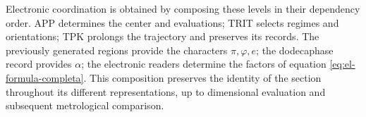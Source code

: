 Electronic coordination is obtained by composing these levels in their
dependency order. APP determines the center and evaluations;
TRIT selects regimes and orientations; TPK prolongs the trajectory
and preserves its records. The previously generated regions provide
the characters \(\pi,\varphi,e\); the dodecaphase record provides
\(\alpha\); the electronic readers determine the factors of
equation \eqref{eq:el-formula-completa}. This composition preserves
the identity of the section throughout its different
representations, up to dimensional evaluation and subsequent
metrological comparison.
